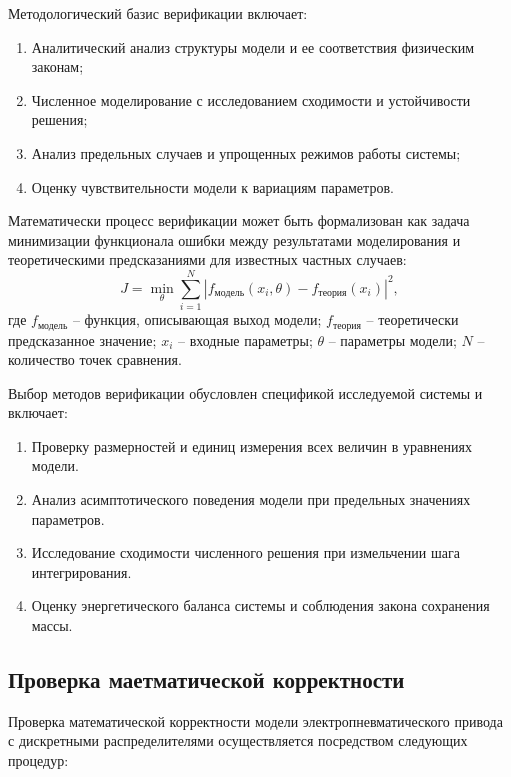 Методологический базис верификации включает:

\begin{enumerate}
    \item Аналитический анализ структуры модели и ее соответствия физическим законам;
    \item Численное моделирование с исследованием сходимости и устойчивости решения;
    \item Анализ предельных случаев и упрощенных режимов работы системы;
    \item Оценку чувствительности модели к вариациям параметров.
\end{enumerate}

Математически процесс верификации может быть формализован как задача минимизации функционала
ошибки между результатами моделирования и теоретическими предсказаниями для известных частных случаев:
\begin{equation}
    J = \min_{\theta} \sum_{i=1}^{N} \left| f_{\text{модель}}(x_i, \theta) - f_{\text{теория}}(x_i) \right|^2,
\end{equation}
где $f_{\text{модель}}$ -- функция, описывающая выход модели;
$f_{\text{теория}}$ -- теоретически предсказанное значение;
$x_i$ -- входные параметры;
$\theta$ -- параметры модели;
$N$ -- количество точек сравнения.

Выбор методов верификации обусловлен спецификой исследуемой системы и включает:

\begin{enumerate}
    \item Проверку размерностей и единиц измерения всех величин в уравнениях модели.
    \item    Анализ асимптотического поведения модели при предельных значениях параметров.
    \item Исследование сходимости численного решения при измельчении шага интегрирования.
    \item Оценку энергетического баланса системы и соблюдения закона сохранения массы.
\end{enumerate}

\subsection{Проверка маетматической корректности}\label{sec:ch2/sec6/subsec2}

Проверка математической корректности модели электропневматического привода с дискретными распределителями осуществляется посредством следующих процедур:

